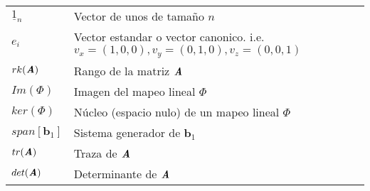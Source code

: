 \begin{table}[ht!]
\begin{center}
\begin{tabularx}{\textwidth}{|l|X|}
            $\underline{1}_{n}$                                                                                                  & Vector de unos de tamaño $n$                                                                                                                                                \\
            $e_{i}$                                                                                                              & Vector estandar o vector canonico. i.e. ${\scriptscriptstyle v_{x} = (1,0,0), v_{y} = (0,1,0), v_{z} = (0,0,1)}$                                                            \\
            $rk(\textbf{\textit{A}})$                                                                                            & Rango de la matriz $\textit{\textbf{A}}$                                                                                                                                    \\
            $Im(\Phi)$                                                                                                           & Imagen del mapeo lineal $\Phi$                                                                                                                                              \\
            $ker(\Phi)$                                                                                                          & Núcleo (espacio nulo) de un mapeo lineal $\Phi$                                                                                                                             \\
            $span[\textbf{b}_{1}]$                                                                                               & Sistema generador de $\textbf{b}_{1}$                                                                                                                                       \\
            $tr(\textbf{\textit{A}})$                                                                                            & Traza de $\textit{\textbf{A}}$                                                                                                                                              \\
            $det(\textbf{\textit{A}})$                                                                                           & Determinante de $\textit{\textbf{A}}$                                                                                                                                       \\

\end{tabularx}
\end{center}
\end{table}
